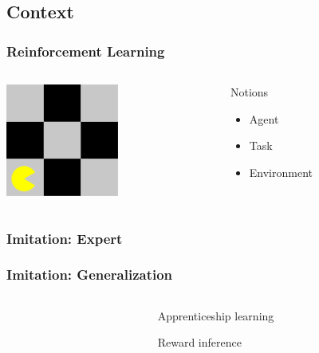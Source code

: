 \documentclass{beamer}
\begin{document}
\subsection{Context}
\label{sec-1_1}
\begin{frame}
\frametitle{Reinforcement Learning}
\label{sec-1_1_1}
\begin{columns}
\begin{column}{0.4\textwidth}
\label{sec-1_1_1_1}

     \includegraphics[width=10em]{ML.png}
\end{column}
\begin{column}{0.4\textwidth}
\begin{block}{Notions}
\label{sec-1_1_1_2}


\begin{itemize}
\item Agent
\item Task
\item Environment
\end{itemize}
\end{block}
\end{column}
\end{columns}
\end{frame}
\begin{frame}
\frametitle{Imitation: Expert}
\label{sec-1_1_2}

\end{frame}
\begin{frame}
\frametitle{Imitation: Generalization}
\label{sec-1_1_3}
\begin{columns}
\begin{column}{.4\textwidth}
\label{sec-1_1_3_1}

\end{column}
\begin{column}{.4\textwidth}
\begin{block}{Apprenticeship learning}
\label{sec-1_1_3_2}

     Reward inference
\end{block}
\end{column}
\end{columns}
\end{frame}
\end{document}
